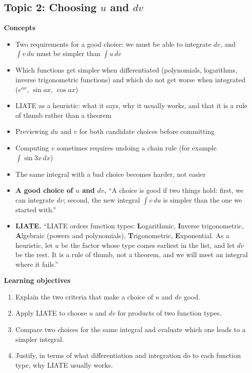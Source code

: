 \documentclass[11pt]{article}
\begin{document}
\subsection{Topic 2: Choosing \texorpdfstring{$u$ and $dv$}{u and dv}}

\textbf{Concepts}
\begin{itemize}
\item Two requirements for a good choice: we must be able to integrate $dv$, and $\int v\,du$ must be simpler than $\int u\,dv$
\item Which functions get simpler when differentiated (polynomials, logarithms, inverse trigonometric functions) and which do not get worse when integrated ($e^{ax}$, $\sin ax$, $\cos ax$)
\item LIATE as a heuristic: what it says, why it usually works, and that it is a rule of thumb rather than a theorem
\item Previewing $du$ and $v$ for both candidate choices before committing
\item Computing $v$ sometimes requires undoing a chain rule (for example $\int\sin 3x\,dx$)
\item The same integral with a bad choice becomes harder, not easier
\end{itemize}

\begin{defbox}
\begin{itemize}
\item \textbf{A good choice of $u$ and $dv$.} ``A choice is good if two things hold: first, we can integrate $dv$; second, the new integral $\int v\,du$ is simpler than the one we started with.''
\item \textbf{LIATE.} ``LIATE orders function types: \textbf{L}ogarithmic, \textbf{I}nverse trigonometric, \textbf{A}lgebraic (powers and polynomials), \textbf{T}rigonometric, \textbf{E}xponential. As a heuristic, let $u$ be the factor whose type comes earliest in the list, and let $dv$ be the rest. It is a rule of thumb, not a theorem, and we will meet an integral where it fails.''
\end{itemize}
\end{defbox}

\textbf{Learning objectives}
\begin{enumerate}
\item Explain the two criteria that make a choice of $u$ and $dv$ good.
\item Apply LIATE to choose $u$ and $dv$ for products of two function types.
\item Compare two choices for the same integral and evaluate which one leads to a simpler integral.
\item Justify, in terms of what differentiation and integration do to each function type, why LIATE usually works.
\end{enumerate}
\end{document}

